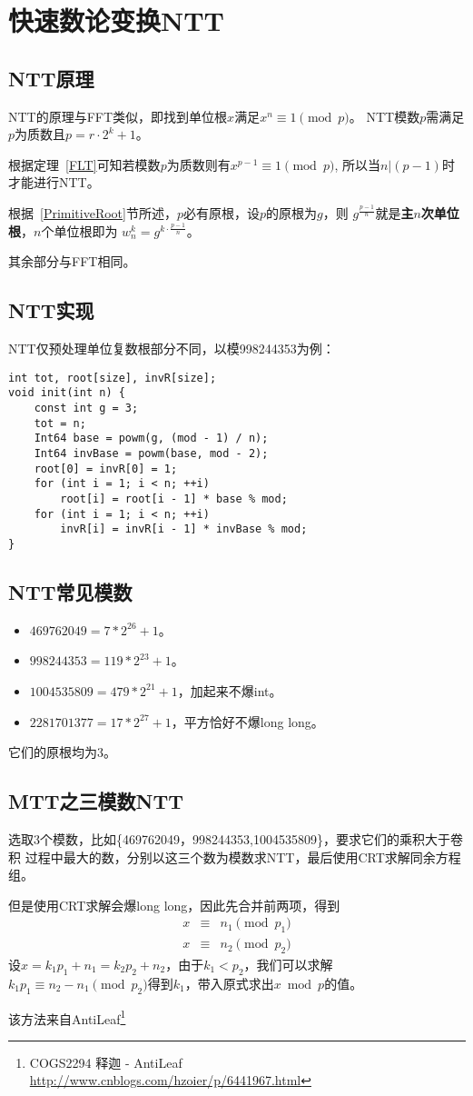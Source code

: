 \section{快速数论变换NTT}
\subsection{NTT原理}
NTT的原理与FFT类似，即找到单位根$x$满足$x^n\equiv 1 \pmod{p}$。
NTT模数$p$需满足$p$为质数且$p=r\cdot 2^k+1$。

根据定理~\ref{FLT}可知若模数$p$为质数则有$x^{p-1}\equiv 1 \pmod{p}$,
所以当$n|(p-1)$时才能进行NTT。

根据~\ref{PrimitiveRoot}节所述，$p$必有原根，设$p$的原根为$g$，则
$g^\frac{p-1}{n}$就是{\bfseries 主$n$次单位根}，$n$个单位根即为
$w_n^k=g^{k\cdot \frac{p-1}{n}}$。

其余部分与FFT相同。

\subsection{NTT实现}
NTT仅预处理单位复数根部分不同，以模998244353为例：
\begin{lstlisting}
int tot, root[size], invR[size];
void init(int n) {
    const int g = 3;
    tot = n;
    Int64 base = powm(g, (mod - 1) / n);
    Int64 invBase = powm(base, mod - 2);
    root[0] = invR[0] = 1;
    for (int i = 1; i < n; ++i)
        root[i] = root[i - 1] * base % mod;
    for (int i = 1; i < n; ++i)
        invR[i] = invR[i - 1] * invBase % mod;
}
\end{lstlisting}
\subsection{NTT常见模数}
\begin{itemize}
    \item $469762049=7*2^{26}+1$。
    \item $998244353=119*2^{23}+1$。
    \item $1004535809=479*2^{21}+1$，加起来不爆int。
    \item $2281701377=17*2^{27}+1$，平方恰好不爆long long。
\end{itemize}
它们的原根均为3。
\subsection{MTT之三模数NTT}
选取3个模数，比如\{469762049，998244353,1004535809\}，要求它们的乘积大于卷积
过程中最大的数，分别以这三个数为模数求NTT，最后使用CRT求解同余方程组。

但是使用CRT求解会爆long long，因此先合并前两项，得到
\begin{eqnarray*}
    x&\equiv&n_1 \pmod{p_1}\\
    x&\equiv&n_2 \pmod{p_2}
\end{eqnarray*}
设$x=k_1p_1+n_1=k_2p_2+n_2$，由于$k_1<p_2$，我们可以求解
$k_1p_1\equiv n_2-n_1 \pmod{p_2}$得到$k_1$，带入原式求出$x \bmod{p}$的值。

该方法来自AntiLeaf\footnote{COGS2294 释迦 - AntiLeaf
\url{http://www.cnblogs.com/hzoier/p/6441967.html}}

